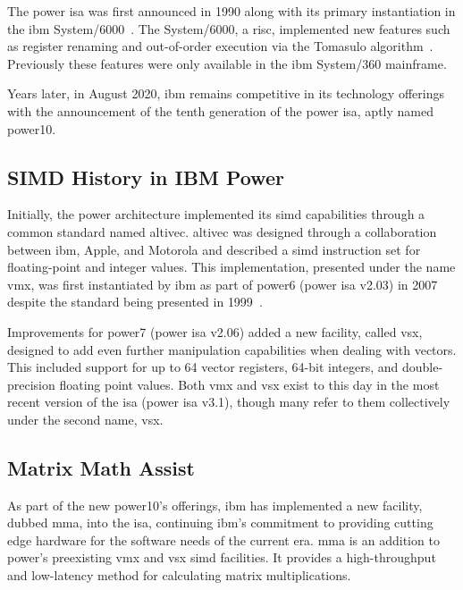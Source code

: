 \documentclass[\main/thesis.tex]{subfiles}
\begin{document}
The \gls{power} \gls{isa} was first announced in 1990 along with its primary instantiation in the \gls{ibm} System/6000~\autocite{montoye1990design}.
The System/6000, a \gls{risc}, implemented new features such as register renaming and out-of-order execution via the Tomasulo algorithm~\autocite{tomasulo1967efficient}.
Previously these features were only available in the \gls{ibm} System/360 mainframe.

Years later, in August 2020, \gls{ibm} remains competitive in its technology offerings with the announcement of the tenth generation of the \gls{power} \gls{isa}, aptly named \gls{power10}.

\subsection{SIMD History in IBM Power}
Initially, the \gls{power} architecture implemented its \gls{simd} capabilities through a common standard named \gls{altivec}.
\Gls{altivec} was designed through a collaboration between \gls{ibm}, Apple, and Motorola and described a \gls{simd} instruction set for floating-point and integer values.
This implementation, presented under the name \gls{vmx}, was first instantiated by \gls{ibm} as part of \gls{power}6 (\gls{power} \gls{isa} v2.03) in 2007~\autocite{eisen2007ibm} despite the standard being presented in 1999~\autocite{tyler1999altivec}.

Improvements for \gls{power}7 (\gls{power} \gls{isa} v2.06) added a new facility, called \gls{vsx}, designed to add even further manipulation capabilities when dealing with vectors.
This included support for up to 64 vector registers, 64-bit integers, and double-precision floating point values.
Both \gls{vmx} and \gls{vsx} exist to this day in the most recent version of the \gls{isa} (\gls{power} \gls{isa} v3.1), though many refer to them collectively under the second name, \gls{vsx}.

\subsection{Matrix Math Assist}
\label{sec:mmaintro}
As part of the new \gls{power10}'s offerings, \gls{ibm} has implemented a new facility, dubbed \gls{mma}, into the \gls{isa}, continuing \gls{ibm}'s commitment to providing cutting edge hardware for the software needs of the current era.
\gls{mma} is an addition to \gls{power}'s preexisting \gls{vmx} and \gls{vsx} \gls{simd} facilities.
It provides a high-throughput and low-latency method for calculating matrix multiplications.
\end{document}
